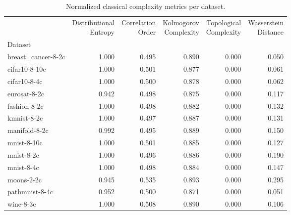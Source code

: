 \begin{table}
\caption{Normalized classical complexity metrics per dataset.}
\label{tab:classical_metrics}
\begin{tabular}{lrrrrr}
\toprule
 & \shortstack{Distributional\\Entropy} & \shortstack{Correlation\\Order} & \shortstack{Kolmogorov\\Complexity} & \shortstack{Topological\\Complexity} & \shortstack{Wasserstein\\Distance} \\
Dataset &  &  &  &  &  \\
\midrule
breast\_cancer-8-2c & 1.000 & 0.495 & 0.890 & 0.000 & 0.050 \\
cifar10-8-10c & 1.000 & 0.501 & 0.877 & 0.000 & 0.061 \\
cifar10-8-4c & 1.000 & 0.500 & 0.878 & 0.000 & 0.062 \\
eurosat-8-2c & 0.942 & 0.498 & 0.875 & 0.000 & 0.117 \\
fashion-8-2c & 1.000 & 0.498 & 0.882 & 0.000 & 0.132 \\
kmnist-8-2c & 1.000 & 0.497 & 0.887 & 0.000 & 0.131 \\
manifold-8-2c & 0.992 & 0.495 & 0.889 & 0.000 & 0.150 \\
mnist-8-10c & 1.000 & 0.501 & 0.885 & 0.000 & 0.127 \\
mnist-8-2c & 1.000 & 0.496 & 0.886 & 0.000 & 0.190 \\
mnist-8-4c & 1.000 & 0.498 & 0.884 & 0.000 & 0.147 \\
moons-2-2c & 0.945 & 0.535 & 0.893 & 0.000 & 0.295 \\
pathmnist-8-4c & 0.952 & 0.500 & 0.871 & 0.000 & 0.051 \\
wine-8-3c & 1.000 & 0.508 & 0.890 & 0.000 & 0.106 \\
\bottomrule
\end{tabular}
\end{table}
